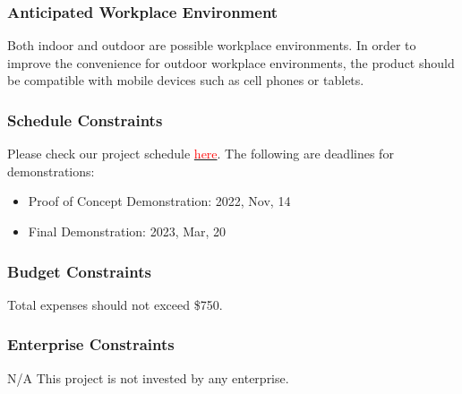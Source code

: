 \documentclass{article}
\begin{document}
\subsubsection{Anticipated Workplace Environment}
Both indoor and outdoor are possible workplace environments. In order to 
improve the convenience for outdoor workplace environments, 
the product should be compatible with mobile devices such
as cell phones or tablets.
\subsubsection{Schedule Constraints}
Please check our project schedule \href{https://github.com/wuj187/DigitalTwinCAS/tree/main/docs/DevelopmentPlan/Project_Schedule}{\textcolor{red}{here}}. The following are deadlines for demonstrations:
\begin{itemize}
    \item Proof of Concept Demonstration: 2022, Nov, 14
    \item Final Demonstration: 2023, Mar, 20
\end{itemize}
\subsubsection{Budget Constraints}
Total expenses should not exceed \$750.
\subsubsection{Enterprise Constraints}
N/A This project is not invested by any enterprise.
\end{document}
